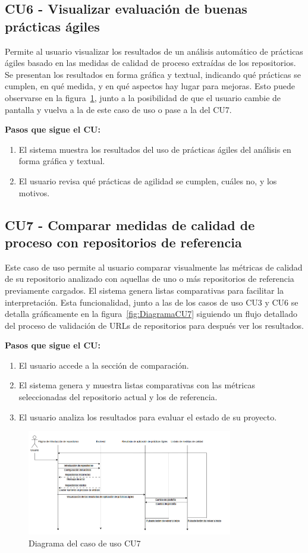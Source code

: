 \subsection*{CU6 - Visualizar evaluación de buenas prácticas ágiles}

Permite al usuario visualizar los resultados de un análisis automático de prácticas ágiles basado en las medidas de calidad de proceso extraídas de los repositorios. Se presentan los resultados en forma gráfica y textual, indicando qué prácticas se cumplen, en qué medida, y en qué aspectos hay lugar para mejoras. Esto puede observarse en la figura~\ref{fig:DiagramaCU3-CU6-CU7}, junto a la posibilidad de que el usuario cambie de pantalla y vuelva a la de este caso de uso o pase a la del CU7.

\textbf{Pasos que sigue el CU:}
\begin{enumerate}
  \item El sistema muestra los resultados del uso de prácticas ágiles del análisis en forma gráfica y textual.
  \item El usuario revisa qué prácticas de agilidad se cumplen, cuáles no, y los motivos.
\end{enumerate}

\subsection*{CU7 - Comparar medidas de calidad de proceso con repositorios de referencia}

Este caso de uso permite al usuario comparar visualmente las métricas de calidad de su repositorio analizado con aquellas de uno o más repositorios de referencia previamente cargados. El sistema genera listas comparativas para facilitar la interpretación. Esta funcionalidad, junto a las de los casos de uso CU3 y CU6 se detalla gráficamente en la figura~\ref{fig:DiagramaCU7} siguiendo un flujo detallado del proceso de validación de URLs de repositorios para después ver los resultados.

\textbf{Pasos que sigue el CU:}
\begin{enumerate}
  \item El usuario accede a la sección de comparación.
  \item El sistema genera y muestra listas comparativas con las métricas seleccionadas del repositorio actual y los de referencia.
  \item El usuario analiza los resultados para evaluar el estado de su proyecto.
\end{enumerate}

\begin{figure}[H]
\centering
\includegraphics[width=0.8\textwidth]{img/DiagramaCU3-CU6-CU7.png}
\caption{Diagrama del caso de uso CU7}
\label{fig:DiagramaCU3-CU6-CU7}
\end{figure}